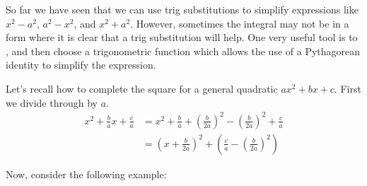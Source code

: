 \documentclass{ximera}
\begin{document}
So far we have seen that we can use trig substitutions to simplify expressions
like $x^{2}-a^{2}$, $a^{2}-x^{2}$, and $x^{2}+a^{2}$. 
However, sometimes the integral may not be in a form where it is clear that a trig substitution 
will help. 
One very useful tool is to , and then choose a
trigonometric function which allows the use of a Pythagorean identity
to simplify the expression. 

Let's recall how to complete the square for a general quadratic $ax^2+bx+c$.  First we divide through by $a$.
\begin{align*}
x^{2}+\frac{b}{a}x+\frac{c}{a} &=x^{2}+\frac{b}{a}+\left(\frac{b}{2a}\right)^{2}-\left(\frac{b}{2a}\right)^{2}+\frac{c}{a} \\
&=\left(x+\frac{b}{2a}\right)^{2}+\left(\frac{c}{a}-\left(\frac{b}{2a}\right)^{2}\right)
\end{align*}

Now, consider the following example:
\end{document}
